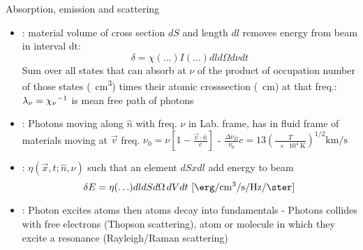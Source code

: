 \begin{frame}{Absorption, emission and scattering}
    \begin{itemize}
        \item {}: material volume of cross section $dS$ and length $dl$ removes energy from beam in interval dt:
            \[\delta=\chi(\ldots)I(\ldots)dld\Omega d\nu dt\]
            Sum over all states that can absorb at $\nu$ of the product of occupation number of those states (\si{\per\cubic\cm}) times their atomic crosssection (\si{\squared\cm}) at that freq.: $\lambda_{\nu}={\chi_{\nu}}^{-1}$ is mean free path of photons
        \item {}: Photons moving along $\hat{n}$ with freq. $\nu$ in Lab. frame, has in fluid frame of materials moving at $\vec{v}$ freq. $\nu_0=\nu[1-\frac{\vec{v}\cdot\hat{n}}{c}]$ - $\frac{\Delta\nu_D}{\nu_0}c=13(\frac{T}{\SI{e4}{\kelvin}})^{1/2}\si{\kilo\meter\per\second}$
        \item {}: $\eta(\vec{x},t;\hat{n},\nu)$ such that an element $dSxdl$ add energy to beam
            \[\delta E=\eta(\ldots)dldSd\Omega\,dVdt\ [\si{\erg\per\cubic\cm\per\second\per\hertz\per\ster}]\]
        \item {}: Photon excites atoms then atoms decay into fundamentals - Photons collides with free electrons (Thopson scattering), atom or molecule in which they excite a resonance (Rayleigh/Raman scattering) 
    \end{itemize}
\end{frame}

